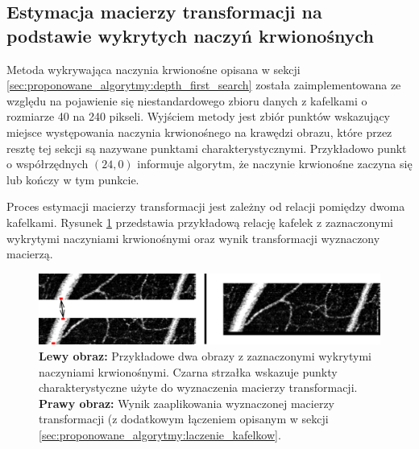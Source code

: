 \subsection{Estymacja macierzy transformacji na podstawie wykrytych naczyń krwionośnych}
\label{sec:proponowane_algorytmy:use_paths}

Metoda wykrywająca naczynia krwionośne opisana w sekcji \ref{sec:proponowane_algorytmy:depth_first_search} została zaimplementowana ze względu na pojawienie się niestandardowego zbioru danych z kafelkami o rozmiarze 40 na 240 pikseli. Wyjściem metody jest zbiór punktów wskazujący miejsce występowania naczynia krwionośnego na krawędzi obrazu, które przez resztę tej sekcji są nazywane punktami charakterystycznymi. Przykładowo punkt o współrzędnych $(24, 0)$ informuje algorytm, że naczynie krwionośne zaczyna się lub kończy w tym punkcie.

Proces estymacji macierzy transformacji jest zależny od relacji pomiędzy dwoma kafelkami. Rysunek \ref{fig:proponowane_algorytmy:path_trans} przedstawia przykładową relację kafelek z zaznaczonymi wykrytymi naczyniami krwionośnymi oraz wynik transformacji wyznaczony macierzą.

\begin{figure}[htb]
  \centering
  \includegraphics[width=\textwidth]{gfx/path_trans}
  \caption{\textbf{Lewy obraz:} Przykładowe dwa obrazy z zaznaczonymi wykrytymi naczyniami krwionośnymi. Czarna strzałka wskazuje punkty charakterystyczne użyte do wyznaczenia macierzy transformacji. \textbf{Prawy obraz:} Wynik zaaplikowania wyznaczonej macierzy transformacji (z dodatkowym łączeniem opisanym w sekcji \ref{sec:proponowane_algorytmy:laczenie_kafelkow}.}
  \label{fig:proponowane_algorytmy:path_trans}
\end{figure}

